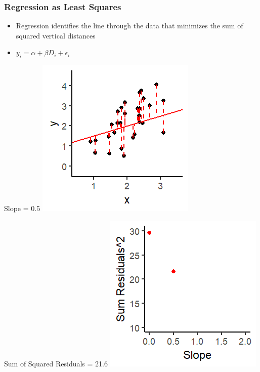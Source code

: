\documentclass[xcolor=x11names,compress]{beamer}\usepackage[]{graphicx}\usepackage[]{color}
\makeatletter
\def\maxwidth{ %
  \ifdim\Gin@nat@width>\linewidth
    \linewidth
  \else
    \Gin@nat@width
  \fi
}
\newenvironment{knitrout}{}{} %
\renewcommand{\(}{\begin{columns}}
\renewcommand{\)}{\end{columns}}
\newcommand{\<}[1]{\begin{column}{#1}}
\renewcommand{\>}{\end{column}}
\makeatother
\begin{document}
\begin{frame}
\frametitle{Regression as Least Squares}
\begin{itemize}
\item Regression identifies the line through the data that minimizes the sum of squared vertical distances 
\item $y_i = \alpha + \beta D_i + \epsilon_i$
\end{itemize}
\begin{multicols}{2}
Slope = 0.5
\begin{knitrout}
\color{fgcolor}
\includegraphics[width=\maxwidth]{figure/graph_ols2-1} 

\end{knitrout}
\columnbreak
Sum of Squared Residuals = 21.6
\begin{knitrout}
\color{fgcolor}
\includegraphics[width=\maxwidth]{figure/graph_ssr2-1} 

\end{knitrout}
\end{multicols}
\end{frame}
\end{document}
